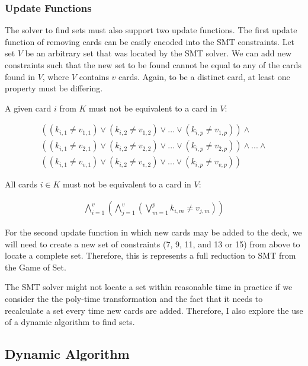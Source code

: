 \documentclass[pageno]{jpaper}
\begin{document}
\subsubsection{Update Functions} 
The solver to find sets must also support two update functions. The first update function of removing cards can be easily encoded into the SMT constraints. Let set $V$ be an arbitrary set that was located by the SMT solver. We can add new constraints such that the new set to be found cannot be equal to any of the cards found in $V$, where $V$ contains $v$ cards. Again, to be a distinct card, at least one property must be differing. 

A given card $i$ from $K$ must not be equivalent to a card in $V$:

\begin{multline}
	((k_{i,1} \neq v_{1,1}) \vee (k_{i,2} \neq v_{1,2}) \vee ... \vee (k_{i,p} \neq v_{1,p})) \wedge \\
	 ((k_{i,1} \neq v_{2,1}) \vee (k_{i,2} \neq v_{2,2}) \vee ... \vee (k_{i,p} \neq v_{2,p}))  \wedge ... \wedge \\ ((k_{i,1} \neq v_{v,1}) \vee (k_{i,2} \neq v_{v,2}) \vee ... \vee (k_{i,p} \neq v_{v,p})) 
\end{multline}

All cards $i \in K$ must not be equivalent to a card in $V$:

\begin{align}
	\bigwedge \limits_{i=1}^{v}   \left( \bigwedge \limits_{j=1}^{v}  \left( \bigvee \limits_{m = 1}^{p} k_{i,m} \neq v_{j,m} \right)   \right)
\end{align}




For the second update function in which new cards may be added to the deck, we will need to create a new set of constraints (7, 9, 11, and 13 or 15) from above to locate a complete set. Therefore, this is represents a full reduction to SMT from the Game of Set. 

The SMT solver might not locate a set within reasonable time in practice if we consider the the poly-time transformation and the fact that it needs to recalculate a set every time new cards are added. Therefore, I also explore the use of a dynamic algorithm to find sets.

\subsection{Dynamic Algorithm}
\end{document}
